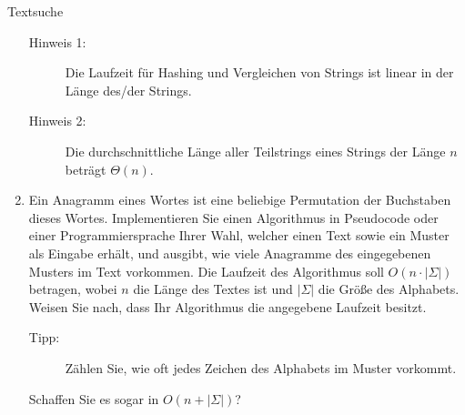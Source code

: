 \documentclass[11pt,a4paper]{article}
\begin{document}
\begin{aufgabe}{3}{Textsuche}
\begin{enumerate}[label=\alph*)]
\begin{description}
            \item[Hinweis 1:] Die Laufzeit für Hashing und Vergleichen von Strings ist linear in der Länge des/der Strings.
            \item[Hinweis 2:] Die durchschnittliche Länge aller Teilstrings eines Strings der Länge $n$ beträgt $\Theta(n)$.
        \end{description}
        \item Ein Anagramm eines Wortes ist eine beliebige Permutation der Buchstaben dieses Wortes.
        Implementieren Sie einen Algorithmus in Pseudocode oder einer Programmiersprache Ihrer Wahl, welcher einen Text sowie ein Muster als Eingabe erhält, und ausgibt, wie viele Anagramme des eingegebenen Musters im Text vorkommen.
        Die Laufzeit des Algorithmus soll $O(n \cdot |\Sigma|)$ betragen, wobei $n$ die Länge des Textes ist und $|\Sigma|$ die Größe des Alphabets.
        Weisen Sie nach, dass Ihr Algorithmus die angegebene Laufzeit besitzt.
        \begin{description}
            \item[Tipp:] Zählen Sie, wie oft jedes Zeichen des Alphabets im Muster vorkommt.
        \end{description}
        Schaffen Sie es sogar in $O(n + |\Sigma|)$?
    \end{enumerate}
    
\end{aufgabe}
\end{document}
